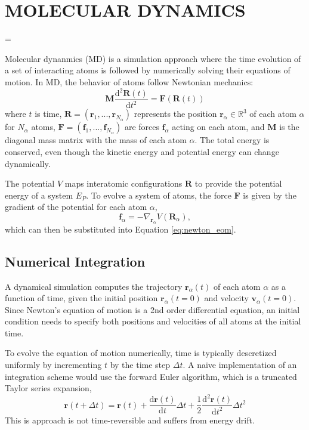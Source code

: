 \chapter{MOLECULAR DYNAMICS}
\label{ch:md}
\hfuzz=20pt
\vfuzz=20pt
\vbadness=\maxdimen

Molecular dynanmics (MD) is a simulation approach where the time evolution of a set of interacting atoms is followed by numerically solving their equations of motion.  In MD, the behavior of atoms follow Newtonian mechanics:
\begin{equation}
	  \label{eq:newton_eom}
    \bm{M}\frac{\mathrm{d}^2\bm{R}(t)}
		           {\mathrm{d} t^2}
		=
		\bm{F}(\bm{R}(t))
\end{equation}
where $t$ is time,
$\bm{R} = (\bm{r}_1,...,\bm{r}_{N_\alpha})$ represents the position $\bm{r}_\alpha \in \mathbb{R}^3$ of each atom $\alpha$ for $N_\alpha$ atoms,
$\bm{F} = (\bm{f}_1,...,\bm{f}_{N_\alpha})$ are forces $\bm{f}_\alpha$ acting on each atom,
and $\bm{M}$ is the diagonal mass matrix with the mass of each atom $\alpha$.
The total energy is conserved, even though the kinetic energy and potential energy can change dynamically.

The potential $V$ maps interatomic configurations $\bm{R}$ to provide the potential energy of a system $E_P$.  To evolve a system of atoms, the force $\bm{F}$ is given by the gradient of the potential for each atom $\alpha$,
\begin{equation}
	\label{eq:calc_forces_from_potential}
	 \bm{f}_\alpha
	 =
	 -\nabla_{\bm{r}_\alpha} V(\bm{R}_\alpha),
\end{equation}
 which can then be substituted into Equation \ref{eq:newton_eom}.

\section{Numerical Integration}
A dynamical simulation computes the trajectory $\bm{r}_\alpha(t)$ of each atom $\alpha$ as a function of time, given the initial position $\bm{r}_\alpha(t=0)$ and velocity $\bm{v}_\alpha(t=0)$.  Since Newton's equation of motion is a 2nd order differential equation, an initial condition needs to specify both positions and velocities of all atoms at the initial time.

To evolve the equation of motion numerically, time is typically descretized uniformly by incrementing $t$ by the time step $\Delta t$.  A naive implementation of an integration scheme would use the forward Euler algorithm, which is a truncated Taylor series expansion,
\begin{equation}
	\bm{r}(t+\Delta t)
	=
	\bm{r}(t)
	+ \frac{\mathrm{d} \bm{r}(t)}
	       {\mathrm{d}t}
		\Delta t
	+ \frac{1}{2}
	  \frac{\mathrm{d}^2 \bm{r}(t)}
		     {\mathrm{d}t^2}
		\Delta t^2
\end{equation}
This is approach is not time-reversible and suffers from energy drift\cite{allen1987_md}.

